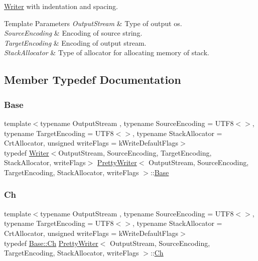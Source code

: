 \hyperlink{classWriter}{Writer} with indentation and spacing. 


\begin{DoxyTemplParams}{Template Parameters}
{\em Output\+Stream} & Type of output os. \\
\hline
{\em Source\+Encoding} & Encoding of source string. \\
\hline
{\em Target\+Encoding} & Encoding of output stream. \\
\hline
{\em Stack\+Allocator} & Type of allocator for allocating memory of stack. \\
\hline
\end{DoxyTemplParams}


\subsection{Member Typedef Documentation}
\mbox{\label{classPrettyWriter_a6eecc5c896dcdaffca739dcd39d13a17}} 
\subsubsection{\texorpdfstring{Base}{Base}}
{\footnotesize\ttfamily template$<$typename Output\+Stream , typename Source\+Encoding  = U\+T\+F8$<$$>$, typename Target\+Encoding  = U\+T\+F8$<$$>$, typename Stack\+Allocator  = Crt\+Allocator, unsigned write\+Flags = k\+Write\+Default\+Flags$>$ \\
typedef \hyperlink{classWriter}{Writer}$<$Output\+Stream, Source\+Encoding, Target\+Encoding, Stack\+Allocator, write\+Flags$>$ \hyperlink{classPrettyWriter}{Pretty\+Writer}$<$ Output\+Stream, Source\+Encoding, Target\+Encoding, Stack\+Allocator, write\+Flags $>$\+::\hyperlink{classPrettyWriter_a6eecc5c896dcdaffca739dcd39d13a17}{Base}}

\mbox{\label{classPrettyWriter_ae35c89bda4c5d59d3ff6efcf2fea45a3}} 
\subsubsection{\texorpdfstring{Ch}{Ch}}
{\footnotesize\ttfamily template$<$typename Output\+Stream , typename Source\+Encoding  = U\+T\+F8$<$$>$, typename Target\+Encoding  = U\+T\+F8$<$$>$, typename Stack\+Allocator  = Crt\+Allocator, unsigned write\+Flags = k\+Write\+Default\+Flags$>$ \\
typedef \hyperlink{classWriter_ab08bff5fd2daec65f4a78779ca3d2139}{Base\+::\+Ch} \hyperlink{classPrettyWriter}{Pretty\+Writer}$<$ Output\+Stream, Source\+Encoding, Target\+Encoding, Stack\+Allocator, write\+Flags $>$\+::\hyperlink{classPrettyWriter_ae35c89bda4c5d59d3ff6efcf2fea45a3}{Ch}}



